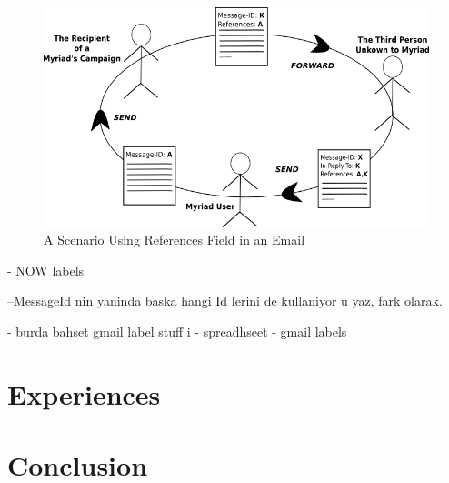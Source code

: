 \begin{figure}[htbp]
	\centering
	\includegraphics[width=1.00\textwidth]{imgs/drawingMessageReferences.png}
	\caption[A Scenario Using References Field in an Email]{A Scenario Using References Field in an Email}
	\label{fig:drawingMessageReferences}
\end{figure}


- NOW labels




--MessageId nin yaninda baska hangi Id lerini de kullaniyor u yaz, fark olarak.


- burda bahset gmail label stuff i
- spreadhseet
- gmail labels

\section{Experiences}
\label{sec:5.5:Expr}

\section{Conclusion}
\label{sec:5.4:Conc}

